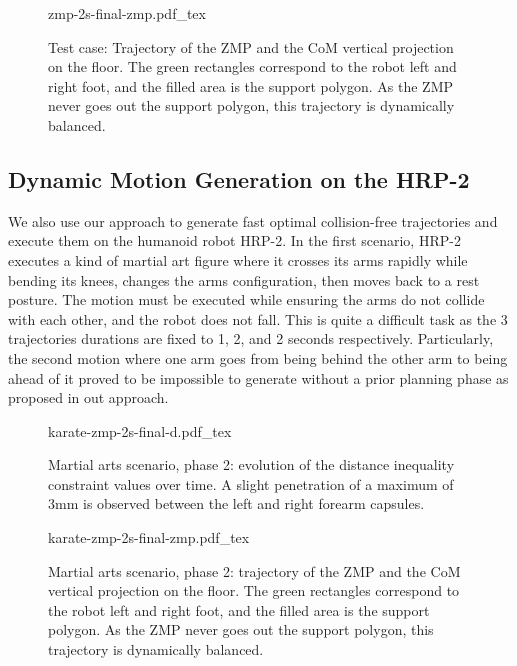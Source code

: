 \begin{figure}
  \centering
      {\def\svgwidth{0.8\linewidth}
        {\scriptsize
          
                     {zmp-2s-final-zmp.pdf_tex}
        }
      }
  \caption{Test case: Trajectory of the ZMP and the CoM vertical
    projection on the floor. The green rectangles correspond to the
    robot left and right foot, and the filled area is the support
    polygon. As the ZMP never goes out the support polygon, this
    trajectory is dynamically balanced.}
  \label{fig:chap3-zmp-2s-final-zmp}
\end{figure}

\subsection{Dynamic Motion Generation on the HRP-2}

We also use our approach to generate fast optimal collision-free
trajectories and execute them on the humanoid robot HRP-2. In the
first scenario, HRP-2 executes a kind of martial art figure where it
crosses its arms rapidly while bending its knees, changes the arms
configuration, then moves back to a rest posture. The motion must be
executed while ensuring the arms do not collide with each other, and
the robot does not fall. This is quite a difficult task as the 3
trajectories durations are fixed to 1, 2, and 2 seconds
respectively. Particularly, the second motion where one arm goes from
being behind the other arm to being ahead of it proved to be
impossible to generate without a prior planning phase as proposed in
out approach.

\begin{figure}
  \centering
      {\def\svgwidth{0.8\linewidth}
        {\scriptsize
          
                     {karate-zmp-2s-final-d.pdf_tex}
        }
      }
  \caption{Martial arts scenario, phase 2: evolution of the distance
    inequality constraint values over time. A slight penetration of a
    maximum of 3mm is observed between the left and right forearm
    capsules.}
  \label{fig:chap3-karate-zmp-2s-final-d}
\end{figure}

\begin{figure}
  \centering
      {\def\svgwidth{0.8\linewidth}
        {\scriptsize
          
                     {karate-zmp-2s-final-zmp.pdf_tex}
        }
      }
  \caption{Martial arts scenario, phase 2: trajectory of the ZMP and
    the CoM vertical projection on the floor. The green rectangles
    correspond to the robot left and right foot, and the filled area
    is the support polygon. As the ZMP never goes out the support
    polygon, this trajectory is dynamically balanced.}
  \label{fig:chap3-karate-zmp-2s-final-zmp}
\end{figure}


